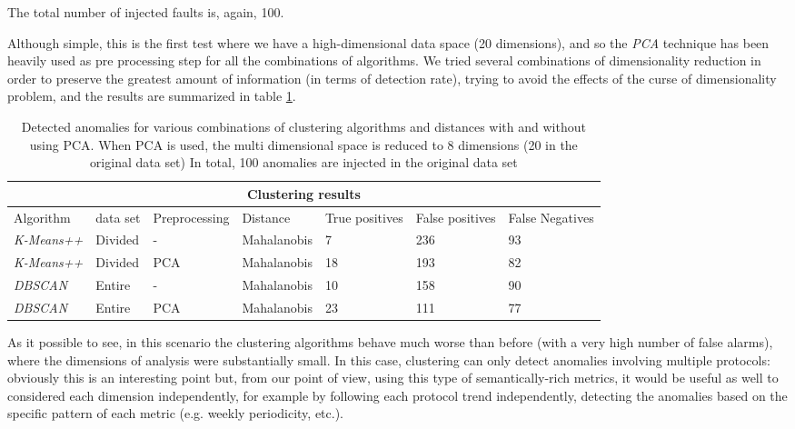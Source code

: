 \documentclass[12pt,a4paper,cucitura]{toptesi}
\begin{document}
The total number of injected faults is, again, 100.

Although simple, this is the first test where we have a high-dimensional data space (20 dimensions), and so the \emph{PCA} technique has been heavily used as pre processing step for all the combinations of algorithms.
We tried several combinations of dimensionality reduction in order to preserve the greatest amount of information (in terms of detection rate), trying to avoid the effects of the curse of dimensionality problem, and the results are summarized in table \ref{tab-proto}.

\begin{center}
\begin{table}
\centering
\begin{tabular}{l|l|l|l|p{1.5cm}|p{1.5cm}|p{1.5cm}}
\hline
\hline
\multicolumn{7}{c}{Clustering results} \\
\hline
Algorithm & data set & Preprocessing & Distance & True positives & False positives & False Negatives \\
\hline
\emph{K-Means++} & Divided & - & Mahalanobis & 7 & 236 & 93 \\
\emph{K-Means++} & Divided & PCA & Mahalanobis & 18 & 193 & 82 \\
\emph{DBSCAN} & Entire & - & Mahalanobis & 10 & 158 & 90 \\
\emph{DBSCAN} & Entire & PCA & Mahalanobis & 23 & 111 & 77 \\
\hline
\hline
\end{tabular}
\caption[Network protocols distribution - detected anomalies]{Detected anomalies for various combinations of clustering algorithms and distances with and without using PCA. When PCA is used, the multi dimensional space is reduced to 8 dimensions (20 in the original data set) In total, 100 anomalies are injected in the original data set}
\label{tab-proto}
\end{table}
\end{center}

As it possible to see, in this scenario the clustering algorithms behave much worse than before (with a very high number of false alarms), where the dimensions of analysis were substantially small.
In this case, clustering can only detect anomalies involving multiple protocols: obviously this is an interesting point but, from our point of view, using this type of semantically-rich metrics, it would be useful as well to considered each dimension independently, for example by following each protocol trend independently, detecting the anomalies based on the specific pattern of each metric (e.g. weekly periodicity, etc.).
\end{document}
